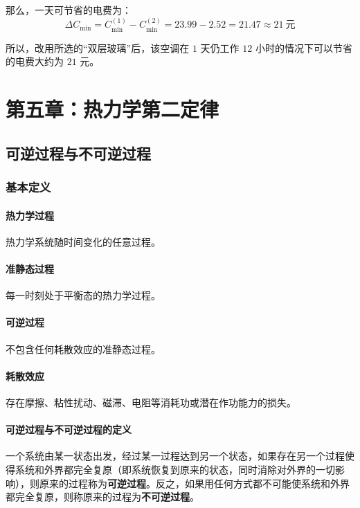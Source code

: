 \documentclass[UTF8]{ctexart}
\begin{document}
那么，一天可节省的电费为：
\begin{equation*}
\Delta C_{\min} = C_{\min}^{(1)} - C_{\min}^{(2)} = 23.99 - 2.52 = 21.47 \approx 21\ \text{元}
\end{equation*}

所以，改用所选的“双层玻璃”后，该空调在 $1$ 天仍工作 $12$ 小时的情况下可以节省的电费大约为 $21$ 元。

\newpage
\section{第五章：热力学第二定律}

\subsection{可逆过程与不可逆过程}

\subsubsection{基本定义}

\paragraph{热力学过程}
热力学系统随时间变化的任意过程。

\paragraph{准静态过程}
每一时刻处于平衡态的热力学过程。

\paragraph{可逆过程}
不包含任何耗散效应的准静态过程。

\paragraph{耗散效应}
存在摩擦、粘性扰动、磁滞、电阻等消耗功或潜在作功能力的损失。

\paragraph{可逆过程与不可逆过程的定义}
一个系统由某一状态出发，经过某一过程达到另一个状态，如果存在另一个过程使得系统和外界都完全复原（即系统恢复到原来的状态，同时消除对外界的一切影响），则原来的过程称为\textbf{可逆过程}。反之，如果用任何方式都不可能使系统和外界都完全复原，则称原来的过程为\textbf{不可逆过程}。
\end{document}
